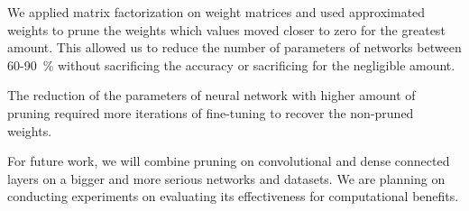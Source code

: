 \documentclass{article} %
\begin{document}
We applied matrix factorization on weight matrices and used 
approximated weights to prune the weights which values moved closer to zero for 
the greatest amount. This allowed us to reduce the number of parameters of 
networks between 60-90~\% without sacrificing the accuracy or sacrificing for 
the negligible amount. 

The reduction of the parameters of neural network with 
higher amount of pruning required more iterations of fine-tuning to recover the 
non-pruned 
weights. 

For future work, we will combine pruning on convolutional and dense connected 
layers on a bigger and more serious networks and datasets.
We are planning on conducting experiments on evaluating its effectiveness for 
computational benefits.





\end{document}
